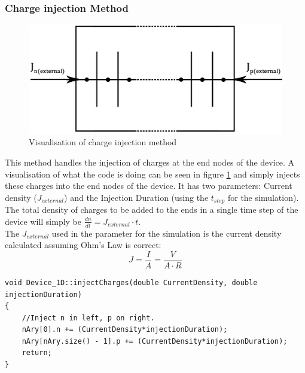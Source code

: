 \documentclass[titlepage]{article}
\begin{document}
\subsubsection{Charge injection Method}
\begin{figure}[h]
	\includegraphics[scale=0.17]{Figures/Injection}
	\caption{\label{fig:Code:Injection} Visualisation of charge injection method}
\end{figure}
This method handles the injection of charges at the end nodes of the device. A visualisation of what the code is doing can be seen in figure \ref{fig:Code:Injection} and simply injects these charges into the end nodes of the device.
It has two parameters: Current density ($J_{external}$) and the Injection Duration (using the $t_{step}$ for the simulation). The total density of charges to be added to the ends in a single time step of the device will simply be $\frac{dn}{dt} = J_{external}\cdot t$.\\
The $J_{external}$ used in the parameter for the simulation is the current density calculated assuming Ohm's Law is correct:
\begin{equation}
	J = \frac{I}{A} = \frac{V}{A\cdot R}
\end{equation}
\begin{lstlisting}[caption = Charge injection method, basicstyle=\tiny]
void Device_1D::injectCharges(double CurrentDensity, double injectionDuration)
{
	//Inject n in left, p on right.
	nAry[0].n += (CurrentDensity*injectionDuration);
	nAry[nAry.size() - 1].p += (CurrentDensity*injectionDuration);
	return;
}
\end{lstlisting}
\end{document}
